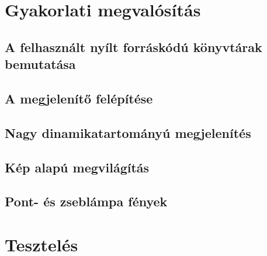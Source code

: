 \documentclass[12pt,oneside]{book}
\begin{document}
\section{Gyakorlati megvalósítás}
\subsection{A felhasznált nyílt forráskódú könyvtárak bemutatása}
\subsection{A megjelenítő felépítése}
\subsection{Nagy dinamikatartományú megjelenítés}
\subsection{Kép alapú megvilágítás}
\subsection{Pont- és zseblámpa fények}

\section{Tesztelés}
\end{document}
